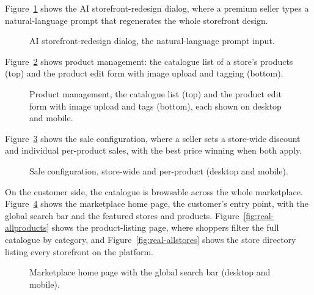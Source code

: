 Figure~\ref{fig:real-airedesign} shows the AI storefront-redesign dialog,
where a premium seller types a natural-language prompt that regenerates the
whole storefront design.

\begin{figure}[H]
  \centering
  \caption{AI storefront-redesign dialog, the natural-language prompt input.}
  \label{fig:real-airedesign}
\end{figure}

Figure~\ref{fig:real-product} shows product management: the catalogue list
of a store's products (top) and the product edit form with image upload and
tagging (bottom).

\begin{figure}[H]
  \centering
  \caption{Product management, the catalogue list (top) and the product edit form with image upload and tags (bottom), each shown on desktop and mobile.}
  \label{fig:real-product}
\end{figure}

Figure~\ref{fig:real-sale} shows the sale configuration, where a seller
sets a store-wide discount and individual per-product sales, with the
best price winning when both apply.

\begin{figure}[H]
  \centering
  \caption{Sale configuration, store-wide and per-product (desktop and mobile).}
  \label{fig:real-sale}
\end{figure}

On the customer side, the catalogue is browsable across the whole
marketplace. Figure~\ref{fig:real-home} shows the marketplace home page,
the customer's entry point, with the global search bar and the featured
stores and products. Figure~\ref{fig:real-allproducts} shows the
product-listing page, where shoppers filter the full catalogue by
category, and Figure~\ref{fig:real-allstores} shows the store directory
listing every storefront on the platform.

\begin{figure}[H]
  \centering
  \caption{Marketplace home page with the global search bar (desktop and mobile).}
  \label{fig:real-home}
\end{figure}


